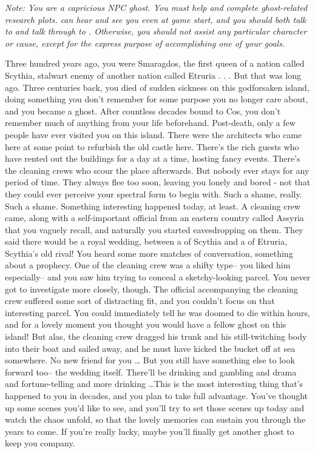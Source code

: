 \documentclass[char]{Kos}
\begin{document}
\name{\cEmeraldQueen{}}

	\emph{Note: You are a capricious NPC ghost. You must help \cAnarchist{} and \cButler{} complete ghost-related research plots. \cButler{} can hear and see you even at game start, and you should both talk to \cButler{\them} and talk through \cButler{\them} to \cAnarchist{}. Otherwise, you should not assist any particular character or cause, except for the express purpose of accomplishing one of your goals.}
	
	Three hundred years ago, you were Smaragdos, the first queen of a nation called Scythia, stalwart enemy of another nation called Etruria . . . But that was long ago. Three centuries back, you died of sudden sickness on this godforsaken island, doing something you don't remember for some purpose you no longer care about, and you became a ghost. After countless decades bound to Cos, you don't remember much of anything from your life beforehand.
	 Post-death, only a few people have ever visited you on this island. There were the architects who came here at some point to refurbish the old castle here. There's the rich guests who have rented out the buildings for a day at a time, hosting fancy events. There's the cleaning crews who scour the place afterwards. But nobody ever stays for any period of time. They always flee too soon, leaving you lonely and bored - not that they could ever perceive your spectral form to begin with. Such a shame, really. Such a shame.
	 Something interesting happened today, at least. A cleaning crew came, along with a self-important official from an eastern country called Assyria that you vaguely recall, and naturally you started eavesdropping on them. They said there would be a royal wedding, between a \cBride{\prince} of Scythia and a \cGroom{\prince} of Etruria, Scythia's old rival! You heard some more snatches of conversation, something about a prophecy. One of the cleaning crew was a shifty type-- you liked him especially-- and you saw him trying to conceal a sketchy-looking parcel. You never got to investigate more closely, though. The official accompanying the cleaning crew suffered some sort of distracting fit, and you couldn't focus on that interesting parcel. You could immediately tell he was doomed to die within hours, and for a lovely moment you thought you would have a fellow ghost on this island! But alas, the cleaning crew dragged his trunk and his still-twitching body into their boat and sailed away, and he must have kicked the bucket off at sea somewhere. No new friend for you \ldots
	 But you still have something else to look forward too-- the wedding itself. There'll be drinking and gambling and drama and fortune-telling and more drinking \ldots This is the most interesting thing that's happened to you in decades, and you plan to take full advantage. You've thought up some scenes you'd like to see, and you'll try to set those scenes up today and watch the chaos unfold, so that the lovely memories can sustain you through the years to come.
	 If you're really lucky, maybe you'll finally get another ghost to keep you company.
\end{document}
